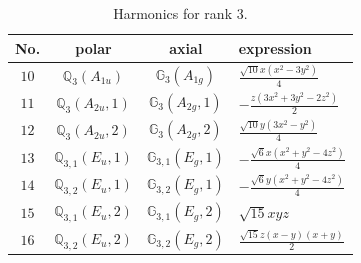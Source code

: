 \documentclass[fleqn,8pt,landscape]{jsarticle}
\begin{document}
\begin{table}[ht!]
\begin{center}
\caption{Harmonics for rank 3.}
\renewcommand{\arraystretch}{1.3}
\begin{tabular}{cccl} \hline \hline
No. & polar & axial & expression \\ \hline
$ 10 $ & $ \mathbb{Q}_{3}(A_{1u}) $ & $ \mathbb{G}_{3}(A_{1g}) $ & $ \frac{\sqrt{10} x \left(x^{2} - 3 y^{2}\right)}{4} $ \\
$ 11 $ & $ \mathbb{Q}_{3}(A_{2u},1) $ & $ \mathbb{G}_{3}(A_{2g},1) $ & $ - \frac{z \left(3 x^{2} + 3 y^{2} - 2 z^{2}\right)}{2} $ \\
$ 12 $ & $ \mathbb{Q}_{3}(A_{2u},2) $ & $ \mathbb{G}_{3}(A_{2g},2) $ & $ \frac{\sqrt{10} y \left(3 x^{2} - y^{2}\right)}{4} $ \\
$ 13 $ & $ \mathbb{Q}_{3,1}(E_{u},1) $ & $ \mathbb{G}_{3,1}(E_{g},1) $ & $ - \frac{\sqrt{6} x \left(x^{2} + y^{2} - 4 z^{2}\right)}{4} $ \\
$ 14 $ & $ \mathbb{Q}_{3,2}(E_{u},1) $ & $ \mathbb{G}_{3,2}(E_{g},1) $ & $ - \frac{\sqrt{6} y \left(x^{2} + y^{2} - 4 z^{2}\right)}{4} $ \\
$ 15 $ & $ \mathbb{Q}_{3,1}(E_{u},2) $ & $ \mathbb{G}_{3,1}(E_{g},2) $ & $ \sqrt{15} x y z $ \\
$ 16 $ & $ \mathbb{Q}_{3,2}(E_{u},2) $ & $ \mathbb{G}_{3,2}(E_{g},2) $ & $ \frac{\sqrt{15} z \left(x - y\right) \left(x + y\right)}{2} $ \\
 \hline \hline
\end{tabular}
\end{center}
\end{table}
\end{document}
